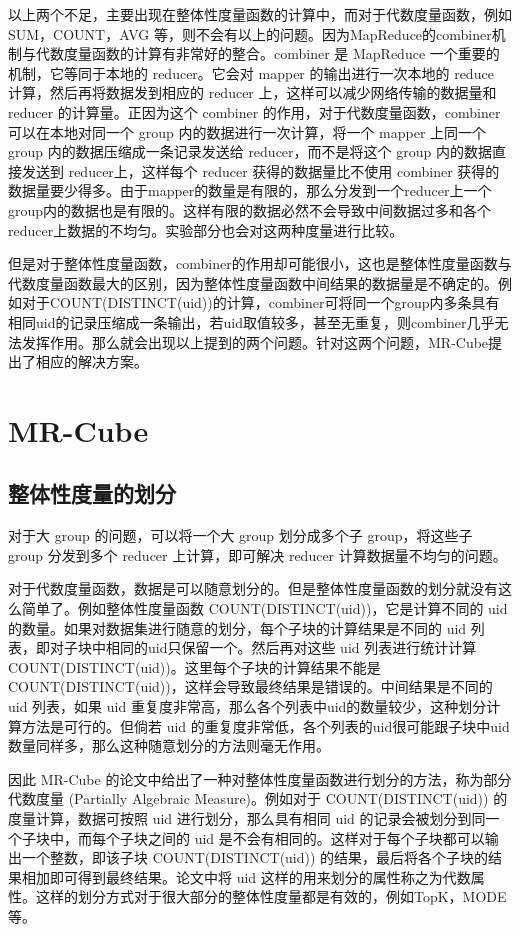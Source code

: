 以上两个不足，主要出现在整体性度量函数的计算中，而对于代数度量函数，例如SUM，COUNT，AVG 等，则不会有以上的问题。因为MapReduce的combiner机制与代数度量函数的计算有非常好的整合。combiner 是 MapReduce 一个重要的机制，它等同于本地的 reducer。它会对 mapper 的输出进行一次本地的 reduce 计算，然后再将数据发到相应的 reducer 上，这样可以减少网络传输的数据量和reducer 的计算量。正因为这个 combiner 的作用，对于代数度量函数，combiner 可以在本地对同一个 group 内的数据进行一次计算，将一个 mapper 上同一个 group 内的数据压缩成一条记录发送给 reducer，而不是将这个 group 内的数据直接发送到 reducer上，这样每个 reducer 获得的数据量比不使用 combiner 获得的数据量要少得多。由于mapper的数量是有限的，那么分发到一个reducer上一个group内的数据也是有限的。这样有限的数据必然不会导致中间数据过多和各个reducer上数据的不均匀。实验部分也会对这两种度量进行比较。

但是对于整体性度量函数，combiner的作用却可能很小，这也是整体性度量函数与代数度量函数最大的区别，因为整体性度量函数中间结果的数据量是不确定的。例如对于COUNT(DISTINCT(uid))的计算，combiner可将同一个group内多条具有相同uid的记录压缩成一条输出，若uid取值较多，甚至无重复，则combiner几乎无法发挥作用。那么就会出现以上提到的两个问题。针对这两个问题，MR-Cube提出了相应的解决方案。

\section{MR-Cube}

\subsection{整体性度量的划分}

对于大 group 的问题，可以将一个大 group 划分成多个子 group，将这些子 group 分发到多个 reducer 上计算，即可解决 reducer 计算数据量不均匀的问题。

对于代数度量函数，数据是可以随意划分的。但是整体性度量函数的划分就没有这么简单了。例如整体性度量函数 COUNT(DISTINCT(uid))，它是计算不同的 uid 的数量。如果对数据集进行随意的划分，每个子块的计算结果是不同的 uid 列表，即对子块中相同的uid只保留一个。然后再对这些 uid 列表进行统计计算 COUNT(DISTINCT(uid))。这里每个子块的计算结果不能是COUNT(DISTINCT(uid))，这样会导致最终结果是错误的。中间结果是不同的 uid 列表，如果 uid 重复度非常高，那么各个列表中uid的数量较少，这种划分计算方法是可行的。但倘若 uid 的重复度非常低，各个列表的uid很可能跟子块中uid数量同样多，那么这种随意划分的方法则毫无作用。 

因此 MR-Cube 的论文中给出了一种对整体性度量函数进行划分的方法，称为部分代数度量 (Partially Algebraic Measure)。例如对于 COUNT(DISTINCT(uid)) 的度量计算，数据可按照 uid 进行划分，那么具有相同 uid 的记录会被划分到同一个子块中，而每个子块之间的 uid 是不会有相同的。这样对于每个子块都可以输出一个整数，即该子块 COUNT(DISTINCT(uid)) 的结果，最后将各个子块的结果相加即可得到最终结果。论文中将 uid 这样的用来划分的属性称之为代数属性。这样的划分方式对于很大部分的整体性度量都是有效的，例如TopK，MODE等。


